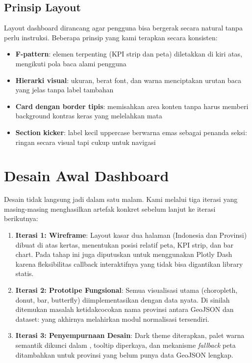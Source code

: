 \subsection{Prinsip Layout}

Layout dashboard dirancang agar pengguna bisa bergerak secara natural tanpa perlu instruksi. Beberapa prinsip yang kami terapkan secara konsisten:

\begin{itemize}
  \item \textbf{F-pattern}: elemen terpenting (KPI strip dan peta) diletakkan di kiri atas, mengikuti pola baca alami pengguna
  \item \textbf{Hierarki visual}: ukuran, berat font, dan warna menciptakan urutan baca yang jelas tanpa label tambahan
  \item \textbf{Card dengan border tipis}: memisahkan area konten tanpa harus memberi background kontras keras yang melelahkan mata
  \item \textbf{Section kicker}: label kecil uppercase berwarna emas sebagai penanda seksi: ringan secara visual tapi cukup untuk navigasi
\end{itemize}

\section{Desain Awal Dashboard}

Desain tidak langsung jadi dalam satu malam. Kami melalui tiga iterasi yang masing-masing menghasilkan artefak konkret sebelum lanjut ke iterasi berikutnya:

\begin{enumerate}
  \item \textbf{Iterasi 1: Wireframe}: Layout kasar dua halaman (Indonesia dan Provinsi) dibuat di atas kertas, menentukan posisi relatif peta, KPI strip, dan bar chart. Pada tahap ini juga diputuskan untuk menggunakan Plotly Dash karena fleksibilitas callback interaktifnya yang tidak bisa digantikan library statis.
  \item \textbf{Iterasi 2: Prototipe Fungsional}: Semua visualisasi utama (choropleth, donut, bar, butterfly) diimplementasikan dengan data nyata. Di sinilah ditemukan masalah ketidakcocokan nama provinsi antara GeoJSON dan dataset: yang akhirnya melahirkan modul normalisasi tersendiri.
  \item \textbf{Iterasi 3: Penyempurnaan Desain}: Dark theme diterapkan, palet warna semantik dikunci dalam , tooltip diperkaya, dan mekanisme \textit{fallback} peta ditambahkan untuk provinsi yang belum punya data GeoJSON lengkap.
\end{enumerate}

